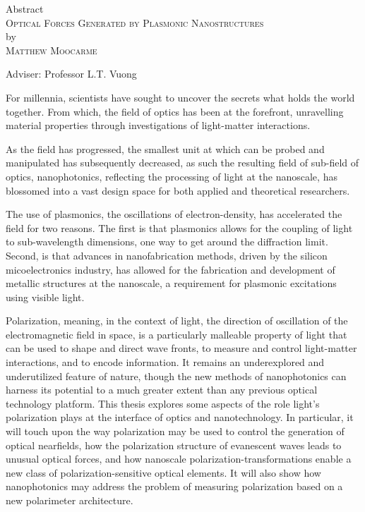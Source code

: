 \begin{center}

Abstract \\
\textsc{Optical Forces Generated by Plasmonic Nanostructures} \\
by \\
\textsc{Matthew Moocarme} \\[0.25in]
\end{center}

\vspace{0.25in}

\noindent Adviser: Professor L.T. Vuong

\vspace{0.25in}

\noindent 


For millennia, scientists have sought to uncover the secrets what holds the world together. From which, the field of optics has been at the forefront, unravelling material properties through investigations of light-matter interactions. 

As the field has progressed, the smallest unit at which can be probed and manipulated has subsequently decreased, as such the resulting field of sub-field of optics, nanophotonics, reflecting the processing of light at the nanoscale, has blossomed into a vast design space for both applied and theoretical researchers.

The use of plasmonics, the oscillations of electron-density, has accelerated the field for two reasons. The first is that plasmonics allows for the coupling of light to sub-wavelength dimensions, one way to get around the diffraction limit. Second, is that advances in nanofabrication methods, driven by the silicon micoelectronics industry, has allowed for the fabrication and development of metallic structures at the nanoscale, a requirement for plasmonic excitations using visible light.

Polarization, meaning, in the context of light, the direction of oscillation of the electromagnetic field in space, is a particularly malleable property of light that can be used to shape and direct wave fronts, to measure and control light-matter interactions, and to encode information. It remains an underexplored and underutilized feature of nature, though the new methods of nanophotonics can harness its potential to a much greater extent than any previous optical technology platform. This thesis explores some aspects of the role light’s polarization plays at the interface of optics and nanotechnology. In particular, it will touch upon the way polarization may be used to control the generation of optical nearfields, how the polarization structure of evanescent waves leads to unusual optical forces, and how nanoscale polarization-transformations enable a new class of polarization-sensitive optical elements. It will also show how nanophotonics may address the problem of measuring polarization based on a new polarimeter architecture.
